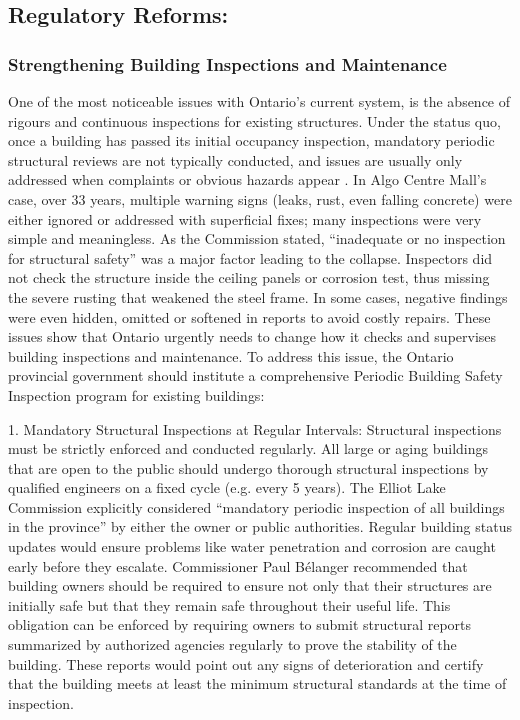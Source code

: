 \documentclass[12pt]{article}
\begin{document}

\subsection{Regulatory Reforms:}

\subsubsection{Strengthening Building Inspections and Maintenance}

One of the most noticeable issues with Ontario's current system, is the absence of rigours and continuous inspections for existing structures. Under the status quo, once a building has passed its initial occupancy inspection, mandatory periodic structural reviews are not typically conducted, and issues are usually only addressed when complaints or obvious hazards appear \cite{DoodyRemarksPEO}. In Algo Centre Mall's case, over 33 years, multiple warning signs (leaks, rust, even falling concrete) were either ignored or addressed with superficial fixes; many inspections were very simple and meaningless. As the Commission stated, “inadequate or no inspection for structural safety” was a major factor leading to the collapse. Inspectors did not check the structure inside the ceiling panels or corrosion test, thus missing the severe rusting that weakened the steel frame. In some cases, negative findings were even hidden, omitted or softened in reports to avoid costly repairs. These issues show that Ontario urgently needs to change how it checks and supervises building inspections and maintenance. To address this issue, the Ontario provincial government should institute a comprehensive Periodic Building Safety Inspection program for existing buildings:

1. Mandatory Structural Inspections at Regular Intervals: Structural inspections must be strictly enforced and conducted regularly. All large or aging buildings that are open to the public should undergo thorough structural inspections by qualified engineers on a fixed cycle (e.g. every 5 years). The Elliot Lake Commission explicitly considered “mandatory periodic inspection of all buildings in the province” by either the owner or public authorities. Regular building status updates would ensure problems like water penetration and corrosion are caught early before they escalate. Commissioner Paul Bélanger recommended that building owners should be required to ensure not only that their structures are initially safe but that they remain safe throughout their useful life. This obligation can be enforced by requiring owners to submit structural reports summarized by authorized agencies regularly to prove the stability of the building. These reports would point out any signs of deterioration and certify that the building meets at least the minimum structural standards at the time of inspection.
\end{document}
